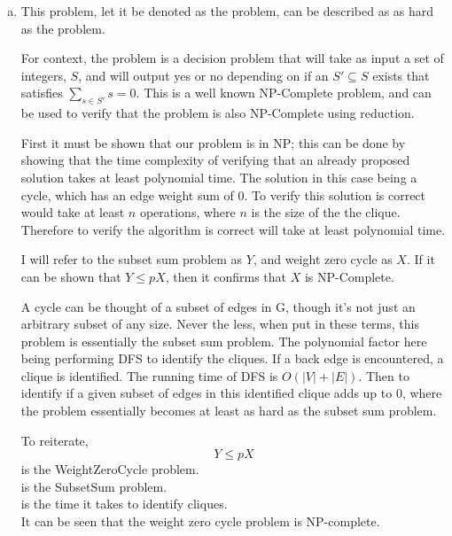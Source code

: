\documentclass[10pt]{article}
\begin{document}
\begin{question}
    \begin{enumerate}[a)]
        \item %
        This problem, let it be denoted as the  problem, can be described as  as hard as the  problem.
        
        For context, the  problem is a decision problem that will take as input a set of integers, $S$, and will output yes or no depending on if an $S' \subseteq S$ exists that satisfies $\sum_{s \in S'}^{}s = 0$. This is a well known NP-Complete problem, and can be used to verify that the  problem is also NP-Complete using reduction.
        
        First it must be shown that our problem is in NP; this can be done by showing that the time complexity of verifying that an already proposed solution takes at least polynomial time. The solution in this case being a cycle, which has an edge weight sum of 0. To verify this solution is correct would take at least  $n$ operations, where $n$ is the size of the the clique. Therefore to verify the algorithm is correct will take at least polynomial time.
        
        I will refer to the subset sum problem as $Y$, and weight zero cycle as $X$. If it can be shown that $Y \leq pX$, then it confirms that $X$ is NP-Complete.
        
        A cycle can be thought of a subset of edges in G, though it's not just an arbitrary subset of any size. Never the less, when put in these terms, this problem is essentially the subset sum problem. The polynomial factor here being performing DFS to identify the cliques. If a back edge is encountered, a clique is identified. The running time of DFS is $O(|V| + |E|)$. Then to identify if a given subset of edges in this identified clique adds up to 0, where the problem essentially becomes at least as hard as the subset sum problem.
        
        To reiterate,
        $$ Y \leq pX $$
         is the WeightZeroCycle problem. \\
         is the SubsetSum problem. \\
         is the time it takes to identify cliques. \\

        It can be seen that the weight zero cycle problem is NP-complete.
    \end{enumerate}  
\end{question}
\end{document}
